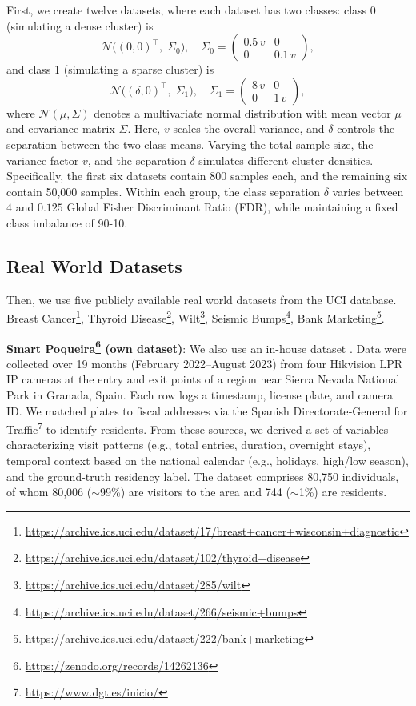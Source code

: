\documentclass[preprint,12pt]{elsarticle}
\begin{document}
First, we create twelve datasets, where each dataset has two classes: class 0 (simulating a dense cluster) is  
\[
\mathcal{N}\bigl((0,0)^\top,\;\Sigma_{0}\bigr),\quad
\Sigma_{0}=\begin{pmatrix}0.5\,v&0\\0&0.1\,v\end{pmatrix},
\]
and class 1 (simulating a sparse cluster) is  
\[
\mathcal{N}\bigl((\delta,0)^\top,\;\Sigma_{1}\bigr),\quad
\Sigma_{1}=\begin{pmatrix}8\,v&0\\0&1\,v\end{pmatrix},
\]
where $\mathcal{N}(\mu,\Sigma)$ denotes a multivariate normal distribution with mean vector $\mu$ and covariance matrix $\Sigma$. 
Here, $v$ scales the overall variance, and $\delta$ controls the separation between the two class means. 
Varying the total sample size, the variance factor $v$, and the separation $\delta$ simulates different cluster densities. Specifically, the first six datasets contain 800 samples each, and the remaining six contain 50,000 samples. 
Within each group, the class separation $\delta$ varies between $4$ and $0.125$ Global Fisher Discriminant Ratio (FDR), while maintaining a fixed class imbalance of 90-10.

\subsection*{Real World Datasets}

Then, we use five publicly available real world datasets from the UCI database. Breast Cancer\footnote{\url{https://archive.ics.uci.edu/dataset/17/breast+cancer+wisconsin+diagnostic}}, Thyroid Disease\footnote{\url{https://archive.ics.uci.edu/dataset/102/thyroid+disease}}, Wilt\footnote{\url{https://archive.ics.uci.edu/dataset/285/wilt}}, Seismic Bumps\footnote{\url{https://archive.ics.uci.edu/dataset/266/seismic+bumps}}, Bank Marketing\footnote{\url{https://archive.ics.uci.edu/dataset/222/bank+marketing}}.

\textbf{Smart Poqueira\footnote{\url{https://zenodo.org/records/14262136}} (own dataset)}: We also use an in-house dataset \cite{duran2025route,duran2026gct}. Data were collected over 19 months (February 2022–August 2023) from four Hikvision LPR IP cameras at the entry and exit points of a region near Sierra Nevada National Park in Granada, Spain. Each row logs a timestamp, license plate, and camera ID. We matched plates to fiscal addresses via the Spanish Directorate‑General for Traffic\footnote{\url{https://www.dgt.es/inicio/}} to identify residents. From these sources, we derived a set of variables characterizing visit patterns (e.g., total entries, duration, overnight stays), temporal context based on the national calendar (e.g., holidays, high/low season), and the ground-truth residency label. The dataset comprises 80,750 individuals, of whom 80,006 ($\sim$99\%) are visitors to the area and 744 ($\sim$1\%) are residents.
    
\end{document}
